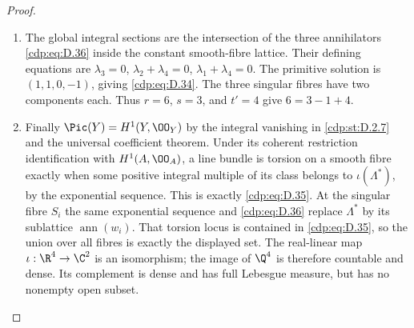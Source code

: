 \begin{proof}
\begin{enumerate}[leftmargin=*]
\item The global integral sections are the intersection of
the three annihilators \eqref{cdp:eq:D.36} inside the constant
smooth-fibre lattice. Their defining equations are
$\lambda_3=0$, $\lambda_2+\lambda_4=0$,
$\lambda_1+\lambda_4=0$. The primitive solution is
$(1,1,0,-1)$, giving \eqref{cdp:eq:D.34}. The three singular fibres have two components each. Thus
$r=6$, $s=3$, and $t'=4$ give $6=3-1+4$.

\item Finally $\Pic(Y)=H^1(Y,\OO_Y)$ by the integral vanishing in \cref{cdp:st:D.2.7}
and the universal coefficient theorem. Under its coherent restriction
identification with $H^1(A,\OO_A)$, a line bundle is
torsion on a smooth fibre exactly when some positive
integral multiple of its class belongs to
$\iota(\Lambda^*)$, by the exponential sequence.
This is exactly \eqref{cdp:eq:D.35}. At the singular fibre $S_i$
the same exponential sequence and \eqref{cdp:eq:D.36} replace
$\Lambda^*$ by its sublattice $\operatorname{ann}(w_i)$.
That torsion locus is contained in \eqref{cdp:eq:D.35}, so the union
over all fibres is exactly the displayed set. The
real-linear map $\iota:\R^4\to\C^2$ is an isomorphism;
the image of $\Q^4$ is therefore countable and dense.
Its complement is dense and has full Lebesgue measure,
but has no nonempty open subset. 

\end{enumerate}
\end{proof}